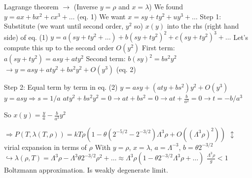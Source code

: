 \documentclass[12pt,a4paper]{report}
\newcommand{\esp}{\vspace{0.5cm}}
\begin{document}
	\esp
	Lagrange theorem $\rightarrow$ (Inverse $y = \rho$ and $x = \lambda$)
	We found $y = ax + bx^2 + cx^3 + \dots$ (eq. 1)
	We want $x = sy + ty^2 + uy^3 + \dots$
	Step 1: Substitute (we want until second order, $y^2$ so)
	$x(y)$ into the rhs (right hand side) of eq. (1)
	$y = a(sy + ty^2 + \dots) + b(sy + ty^2)^2 + c(sy + ty^2)^3 + \dots$
	Let's compute this up to the second order $O(y^2)$
	First term: $a(sy + ty^2) = asy + aty^2$
	Second term: $b(sy)^2 = bs^2y^2$
	$\rightarrow y = asy + aty^2 + bs^2y^2 + O(y^3)$ (eq. 2)
	
	\esp
	Step 2: Equal term by term in eq. (2)
	$y = asy + (aty + bs^2)y^2 + O(y^3)$
	$y = asy \Rightarrow s = 1/a$
	$aty^2 + bs^2y^2 = 0 \rightarrow at + bs^2 = 0 \rightarrow at + \frac{b}{a^2} = 0 \rightarrow t = -b/a^3$
	
	\esp
	So $x(y) = \frac{y}{a} - \frac{b}{a^3} y^2$
	
	\esp
	$\Rightarrow P(T, \lambda(T, \rho)) = kT \rho (1 - \theta (2^{-5/2} - 2^{-3/2}) \Lambda^3 \rho + O((\Lambda^3 \rho)^2))$
	$\updownarrow$ virial expansion in terms of $\rho$
	With $y = \rho$, $x = \lambda$, $a = \Lambda^{-3}$, $b = \theta 2^{-3/2}$
	$\hookrightarrow \lambda(\rho, T) = \Lambda^3 \rho - \Lambda^3 \theta 2^{-3/2} \rho^2 + \dots \approx \Lambda^3 \rho (1 - \theta 2^{-3/2} \Lambda^3 \rho + \dots)$
	$\frac{\Lambda^3 \rho}{g} < 1$ Boltzmann approximation. Is weakly degenerate limit.

	\printbibliography[title={Bibliografía}]
\end{document}
